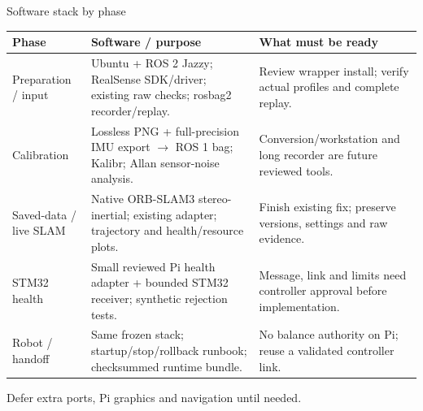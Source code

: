 \begin{frame}{Software stack by phase}
\small\linespread{1.03}\selectfont\renewcommand{\arraystretch}{1.05}
\begin{tabular}{@{}L{40mm}L{86mm}L{58mm}@{}}\toprule
\textbf{Phase} & \textbf{Software / purpose} & \textbf{What must be ready}\\\midrule
Preparation / input & Ubuntu + ROS 2 Jazzy; RealSense SDK/driver; existing raw checks; rosbag2 recorder/replay. & Review wrapper install; verify actual profiles and complete replay.\\
Calibration & Lossless PNG + full-precision IMU export $\to$ ROS 1 bag; Kalibr; Allan sensor-noise analysis. & Conversion/workstation and long recorder are future reviewed tools.\\
Saved-data / live SLAM & Native ORB-SLAM3 stereo-inertial; existing adapter; trajectory and health/resource plots. & Finish existing fix; preserve versions, settings and raw evidence.\\
STM32 health & Small reviewed Pi health adapter + bounded STM32 receiver; synthetic rejection tests. & Message, link and limits need controller approval before implementation.\\
Robot / handoff & Same frozen stack; startup/stop/rollback runbook; checksummed runtime bundle. & No balance authority on Pi; reuse a validated controller link.\\\bottomrule\end{tabular}\par\smallskip\small Defer extra ports, Pi graphics and navigation until needed.
\end{frame}

